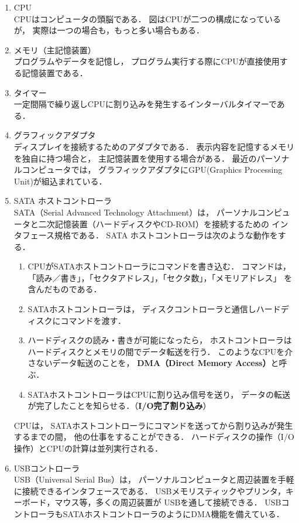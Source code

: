 \begin{enumerate}
\item CPU \\
CPUはコンピュータの頭脳である．
図はCPUが二つの構成になっているが，
実際は一つの場合も，もっと多い場合もある．

\item メモリ（主記憶装置） \\
プログラムやデータを記憶し，
プログラム実行する際にCPUが直接使用する記憶装置である．

\item タイマー \\
一定間隔で繰り返しCPUに割り込みを発生するインターバルタイマーである．

\item グラフィックアダプタ \\
ディスプレイを接続するためのアダプタである．
表示内容を記憶するメモリを独自に持つ場合と，
主記憶装置を使用する場合がある．
最近のパーソナルコンピュータでは，
グラフィックアダプタにGPU(Graphics Processing Unit)が組込まれている．

\item SATA ホストコントローラ　\\
SATA（Serial Advanced Technology Attachment）は，
パーソナルコンピュータと二次記憶装置（ハードディスクやCD-ROM）を接続するための
インタフェース規格である．
SATA ホストコントローラは次のような動作をする．
\begin{enumerate}
\item CPUがSATAホストコントローラにコマンドを書き込む．
コマンドは，
「読み／書き」，「セクタアドレス」，「セクタ数」，「メモリアドレス」
を含んだものである．
\item SATAホストコントローラは，
ディスクコントローラと通信しハードディスクにコマンドを渡す．
\item ハードディスクの読み・書きが可能になったら，
ホストコントローラはハードディスクとメモリの間でデータ転送を行う．
このようなCPUを介さないデータ転送のことを，
{\bf DMA（Direct Memory Access）}と呼ぶ．
\item SATAホストコントローラはCPUに割り込み信号を送り，
データの転送が完了したことを知らせる．（{\bf I/O完了割り込み}）
\end{enumerate}
CPUは，
SATAホストコントローラにコマンドを送ってから割り込みが発生するまでの間，
他の仕事をすることができる．
ハードディスクの操作（I/O操作）とCPUの計算は並列実行される．

\item USBコントローラ \\
USB（Universal Serial Bus）は，
パーソナルコンピュータと周辺装置を手軽に接続できるインタフェースである．
USBメモリスティックやプリンタ，キーボード，マウス等，多くの周辺装置が
USBを通して接続できる．
USBコントローラもSATAホストコントローラのようにDMA機能を備えている．


\end{enumerate}
